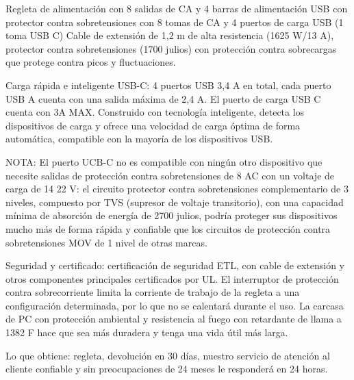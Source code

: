     Regleta de alimentación con 8 salidas de CA y 4 barras de alimentación USB con protector contra sobretensiones con 8 tomas de CA y 4 puertos de carga USB (1 toma USB C) Cable de extensión de 1,2 m de alta resistencia (1625 W/13 A), protector contra sobretensiones (1700 julios) con protección contra sobrecargas que protege contra picos y fluctuaciones.
    
    Carga rápida e inteligente USB-C: 4 puertos USB 3,4 A en total, cada puerto USB A cuenta con una salida máxima de 2,4 A. El puerto de carga USB C cuenta con 3A MAX. Construido con tecnología inteligente, detecta los dispositivos de carga y ofrece una velocidad de carga óptima de forma automática, compatible con la mayoría de los dispositivos USB.
    
    NOTA: El puerto UCB-C no es compatible con ningún otro dispositivo que necesite
    salidas de protección contra sobretensiones de 8 AC con un voltaje de carga de 14 22 V: el circuito protector contra sobretensiones complementario de 3 niveles, compuesto por TVS (supresor de voltaje transitorio), con una capacidad mínima de absorción de energía de 2700 julios, podría proteger sus dispositivos mucho más de forma rápida y confiable que los circuitos de protección contra sobretensiones MOV de 1 nivel de otras marcas.
    
    Seguridad y certificado: certificación de seguridad ETL, con cable de extensión y otros componentes principales certificados por UL. El interruptor de protección contra sobrecorriente limita la corriente de trabajo de la regleta a una configuración determinada, por lo que no se calentará durante el uso. La carcasa de PC con protección ambiental y resistencia al fuego con retardante de llama a 1382 F hace que sea más duradera y tenga una vida útil más larga.
    
    Lo que obtiene: regleta, devolución en 30 días, nuestro servicio de atención al cliente confiable y sin preocupaciones de 24 meses le responderá en 24 horas.
    
